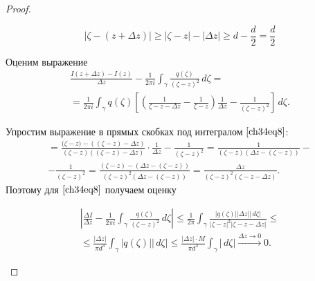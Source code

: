 \begin{proof}\leavevmode
\begin{enumerate}[wide, labelwidth=!, labelindent=\parindent]
\noindent{}
\begin{equation} \label{ch34eq7}
|\zeta - (z + \Delta z)| \ge |\zeta - z| - |\Delta z| \ge d - \frac{d}{2} = \frac{d}{2}
\end{equation}

Оценим выражение 
\begin{multline} \label{ch34eq8}
\frac{I(z + \Delta z) - I(z)}{\Delta z} - \frac{1}{2 \pi i} \int_\gamma \frac{q(\zeta)}{(\zeta - z)^2}\,d\zeta=\\ = \frac{1}{2 \pi i} \int_\gamma q(\zeta) \left[ \left( \frac{1}{\zeta - z - \Delta z} - \frac{1}{\zeta - z} \right) \frac{1}{\Delta z} - \frac{1}{(\zeta - z)^2} \right] \,d\zeta.
\end{multline}

Упростим выражение в прямых скобках под интегралом $\eqref{ch34eq8}$:
\begin{multline*}
[\ldots] = \frac{{(\zeta} - {z}) - (({\zeta} - {z}) - {\Delta z})}{(\zeta - z)((\zeta - z) - \Delta z)} \cdot \frac{1}{{\Delta z}} - \frac{1}{(\zeta - z)^2} = \frac{1}{(\zeta - z)(\Delta z- (\zeta-z) )} -\\- \frac{1}{(\zeta - z)^2} =
\frac{(\zeta - z)-(\Delta z- (\zeta-z))}{(\zeta - z)^2(\Delta z- (\zeta-z) )}
=\frac{\Delta z}{(\zeta - z)^2 (\zeta - z - \Delta z)} .
\end{multline*}
Поэтому для $\eqref{ch34eq8}$ получаем оценку 

\begin{multline*}
\left| \frac{\Delta I}{\Delta z} - \frac{1}{2\pi i} \int_\gamma \frac{q(\zeta)}{(\zeta - z)^2}\,d\zeta \right| 
\le \frac{1}{2\pi} \int_\gamma \frac{|q(\zeta)||\Delta z||\,d\zeta|}{|\zeta - z|^2|\zeta - z - \Delta z|} \le \\
\le \frac{|\Delta z|}{\pi d^3} \int_\gamma |q(\zeta)||\,d\zeta| 
\le \frac{|\Delta z| \cdot M}{\pi d^3} \int_\gamma |\,d\zeta| \xrightarrow{\Delta z \to 0} 0.
\end{multline*}


\end{enumerate}
\end{proof}
